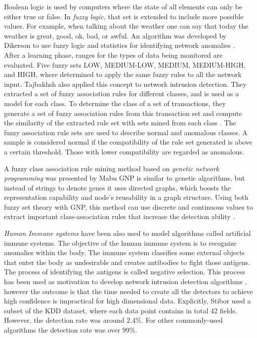 \begin{itemize}
Boolean logic is used by computers where the state of all elements can only be either true or false. In \textit{fuzzy logic}, that set is extended to include more possible values. For example, when talking about the weather one can say that today the weather is great, good, ok, bad, or awful. An algorithm was developed by Dikerson \etAl to use fuzzy logic and statistics for identifying network anomalies \cite{877441}. After a learning phase, ranges for the types of data being monitored are evaluated. Five fuzzy sets LOW, MEDIUM-LOW, MEDIUM, MEDIUM-HIGH, and HIGH, where determined to apply the same fuzzy rules to all the network input. Tajbakhsh \etAl also applied this concept to network intrusion detection. They extracted a set of fuzzy association rules for different classes, and is used as a model for each class. To determine the class of a set of transactions, they generate a set of fuzzy association rules from this transaction set and compute the similarity of the extracted rule set with sets mined from each class \cite{Tajbakhsh2009462}. The fuzzy association rule sets are used to describe normal and anomalous classes. A sample is considered normal if the compatibility of the rule set generated is above a certain threshold. Those with lower compatibility are regarded as anomalous.

A fuzzy class association rule mining method based on \textit{genetic network programming} was presented by Mabu \etAl GNP is similar to genetic algorithms, but instead of strings to denote genes it uses directed graphs, which boosts the representation capability and node's reusability in a graph structure. Using both fuzzy set theory with GNP, this method can use discrete and continuous values to extract important class-association rules that increase the detection ability \cite{5499108}.


\textit{Human Immune systems} have been also used to model algorithms called artificial immune systems. The objective of the human immune system is to recognize anomalies within the body. The immune system classifies some external objects that enter the body as undesirable and creates antibodies to fight those antigens. The process of identifying the antigens is called negative selection. This process has been used as motivation to develop network intrusion detection algorithms \cite{ais}, however the outcome is that the time needed to create all the detectors to achieve high confidence is impractical for high dimensional data. Explicitly, Stibor \etAl used a subset of the KDD dataset, where each data point contains in total 42 fields. However, the detection rate was around 2.4\%. For other commonly-used algorithms the detection rate was over 99\%.



\end{itemize}

